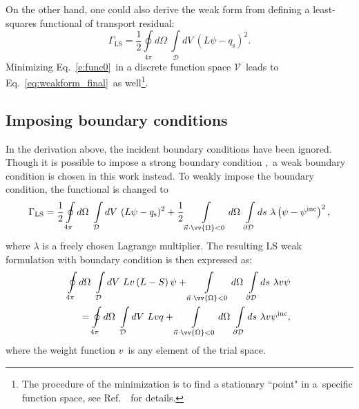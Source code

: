 \documentclass[review]{elsarticle}
\newcommand{\st}{\sigma_\mathrm{t}}
\newcommand{\psii}[1]{\psi^\mathrm{inc}_\mathrm{{#1}}}
\newcommand{\pd}{{\partial\mathcal{D}}}
\newcommand{\ndo}{\vec{n}\cdot\ome}
\newcommand{\absndo}{\left|\ndo\right|}
\newcommand{\qs}{q_\mathrm{s}}
\newcommand{\ome}{\vv{\Omega}}
\newcommand{\lp}{\left(}
\newcommand{\rp}{\right)}
\begin{document}
On the other hand, one could also derive the weak form from defining a least-squares functional of transport residual:
\begin{equation}\label{e:func0}
\Gamma_\mathrm{LS}=\frac{1}{2}\oint\limits_{4\pi}d\Omega\ \int\limits_\mathcal{D}dV\ (L\psi-\qs)^2.
\end{equation}
Minimizing Eq.\ \eqref{e:func0}\ in a discrete function space $\mathcal{V}$\ leads to Eq.~\eqref{eq:weakform_final}\ as well\footnote{The procedure of the minimization is to find a stationary ``point" in {a}\ specific function space, see Ref.\ \cite{runchang}\ for details.}. 


\subsection{Imposing boundary {conditions}}\label{s:ls-cons}
In the derivation above, the incident boundary conditions {have been ignored}. Though it is possible to impose a strong boundary condition \cite{yunhuang_dissertation},\ a weak boundary condition is chosen in this work instead. To weakly impose the boundary condition, the functional is changed to
\begin{align}
\Gamma_\mathrm{LS}=\frac{1}{2}\oint\limits_{4\pi}d\Omega\ \int\limits_\mathcal{D}dV\ (L\psi-\qs)^2+\frac{1}{2}\int\limits_{\ndo<0}d\Omega\ \int\limits_\mathcal{\pd}ds\ \lambda \lp\psi-\psii{}\rp^2, %
\end{align}
where $\lambda$ is {a freely chosen Lagrange multiplier}. The resulting LS weak formulation with boundary condition is then expressed as:
\begin{align}\label{e:ls1}
\oint\limits_{4\pi}d\Omega\ \int\limits_\mathcal{D}dV\ Lv\left(L-S\right)\psi+\int\limits_{\ndo<0}d\Omega\ \int\limits_\mathcal{\pd}ds\ \lambda v\psi\nonumber\\
=\oint\limits_{4\pi}d\Omega\ \int\limits_\mathcal{D}dV\ Lvq+\int\limits_{\ndo<0}d\Omega\ \int\limits_\mathcal{\pd}ds\ \lambda v\psii{},
\end{align}
where the weight function $v$\ is any element of the trial space.
\end{document}

